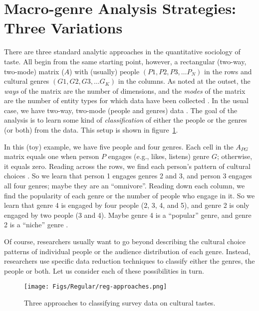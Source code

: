 \section{Macro-genre Analysis Strategies: Three Variations}
There are three standard analytic approaches in the quantitative sociology of taste. All begin from the same starting point, however, a rectangular (two-way, two-mode) matrix ($A$) with (usually) people $\left(P1, P2, P3,\ldots P_N
\right)$ in the rows and cultural genres $\left(G1, G2, G3,\dots G_K\right)$ in the columns. As noted at the outset, the {\em ways} of the matrix are the number of dimensions, and the {\em modes} of the matrix are the number of entity types for which data have been collected \citep{borgatti_everett97}. In the usual case, we have two-way, two-mode (people and genres) data \citep{lizardo18}. The goal of the analysis is to learn some kind of \textit{classification} of either the people or the genres (or both) from the data. This setup is shown in figure~\ref{fig:reg_approaches}. 

In this (toy) example, we have five people and four genres. Each cell in the $A_{PG}$ matrix equals one when person $P$ engages (e.g., likes, listens) genre $G$; otherwise, it equals zero. Reading across the rows, we find each person's pattern of cultural choices \citep{peterson83}. So we learn that person 1 engages genres 2 and 3, and person 3 engages all four genres; maybe they are an ``omnivore''. Reading down each column, we find the popularity of each genre or the number of people who engage in it. So we learn that genre 4 is engaged by four people (2, 3, 4, and 5), and genre 2 is only engaged by two people (3 and 4). Maybe genre 4 is a ``popular'' genre, and genre 2 is a ``niche'' genre \citep{lizardo18}. 

Of course, researchers usually want to go beyond describing the cultural choice patterns of individual people or the audience distribution of each genre. Instead, researchers use specific data reduction techniques to classify either the genres, the people or both. Let us consider each of these possibilities in turn.

\begin{figure}[ht!]
 \centering
 \texttt{[image: Figs/Regular/reg-approaches.png]}
 \caption{Three approaches to classifying survey data on cultural tastes.}
 \label{fig:reg_approaches}
\end{figure}

